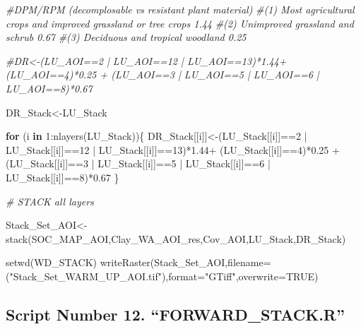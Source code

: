\documentclass[
  10pt,
  b5paper,
]{book}
\newenvironment{Shaded}{\begin{snugshade}}{\end{snugshade}}
\newcommand{\AttributeTok}[1]{\textcolor[rgb]{0.77,0.63,0.00}{#1}}
\newcommand{\CommentTok}[1]{\textcolor[rgb]{0.56,0.35,0.01}{\textit{#1}}}
\newcommand{\ConstantTok}[1]{\textcolor[rgb]{0.00,0.00,0.00}{#1}}
\newcommand{\ControlFlowTok}[1]{\textcolor[rgb]{0.13,0.29,0.53}{\textbf{#1}}}
\newcommand{\DecValTok}[1]{\textcolor[rgb]{0.00,0.00,0.81}{#1}}
\newcommand{\FloatTok}[1]{\textcolor[rgb]{0.00,0.00,0.81}{#1}}
\newcommand{\FunctionTok}[1]{\textcolor[rgb]{0.00,0.00,0.00}{#1}}
\newcommand{\NormalTok}[1]{#1}
\newcommand{\OtherTok}[1]{\textcolor[rgb]{0.56,0.35,0.01}{#1}}
\newcommand{\SpecialCharTok}[1]{\textcolor[rgb]{0.00,0.00,0.00}{#1}}
\newcommand{\StringTok}[1]{\textcolor[rgb]{0.31,0.60,0.02}{#1}}
\begin{document}
\begin{Shaded}
\begin{Highlighting}[]
\CommentTok{\#DPM/RPM (decomplosable vs resistant plant material)}
\CommentTok{\#(1) Most agricultural crops and improved grassland or tree crops 1.44 }
\CommentTok{\#(2) Unimproved grassland and schrub 0.67}
\CommentTok{\#(3) Deciduous and tropical woodland 0.25    }

\CommentTok{\#DR\textless{}{-}(LU\_AOI==2 | LU\_AOI==12 | LU\_AOI==13)*1.44+ (LU\_AOI==4)*0.25 + (LU\_AOI==3 | LU\_AOI==5 | LU\_AOI==6 | LU\_AOI==8)*0.67}

\NormalTok{DR\_Stack}\OtherTok{\textless{}{-}}\NormalTok{LU\_Stack}

\ControlFlowTok{for}\NormalTok{ (i }\ControlFlowTok{in} \DecValTok{1}\SpecialCharTok{:}\FunctionTok{nlayers}\NormalTok{(LU\_Stack))\{}
\NormalTok{DR\_Stack[[i]]}\OtherTok{\textless{}{-}}\NormalTok{(LU\_Stack[[i]]}\SpecialCharTok{==}\DecValTok{2} \SpecialCharTok{|}\NormalTok{ LU\_Stack[[i]]}\SpecialCharTok{==}\DecValTok{12} \SpecialCharTok{|}\NormalTok{ LU\_Stack[[i]]}\SpecialCharTok{==}\DecValTok{13}\NormalTok{)}\SpecialCharTok{*}\FloatTok{1.44}\SpecialCharTok{+}\NormalTok{ (LU\_Stack[[i]]}\SpecialCharTok{==}\DecValTok{4}\NormalTok{)}\SpecialCharTok{*}\FloatTok{0.25} \SpecialCharTok{+}\NormalTok{ (LU\_Stack[[i]]}\SpecialCharTok{==}\DecValTok{3} \SpecialCharTok{|}\NormalTok{ LU\_Stack[[i]]}\SpecialCharTok{==}\DecValTok{5} \SpecialCharTok{|}\NormalTok{ LU\_Stack[[i]]}\SpecialCharTok{==}\DecValTok{6} \SpecialCharTok{|}\NormalTok{ LU\_Stack[[i]]}\SpecialCharTok{==}\DecValTok{8}\NormalTok{)}\SpecialCharTok{*}\FloatTok{0.67}
\NormalTok{\}}

\CommentTok{\# STACK all layers}

\NormalTok{Stack\_Set\_AOI}\OtherTok{\textless{}{-}}\FunctionTok{stack}\NormalTok{(SOC\_MAP\_AOI,Clay\_WA\_AOI\_res,Cov\_AOI,LU\_Stack,DR\_Stack)}

\FunctionTok{setwd}\NormalTok{(WD\_STACK)}
\FunctionTok{writeRaster}\NormalTok{(Stack\_Set\_AOI,}\AttributeTok{filename=}\NormalTok{(}\StringTok{"Stack\_Set\_WARM\_UP\_AOI.tif"}\NormalTok{),}\AttributeTok{format=}\StringTok{"GTiff"}\NormalTok{,}\AttributeTok{overwrite=}\ConstantTok{TRUE}\NormalTok{)}
\end{Highlighting}
\end{Shaded}

\hypertarget{script-number-12.-forward_stack.r}{%
\subsection{Script Number 12. ``FORWARD\_STACK.R''}\label{script-number-12.-forward_stack.r}}
\end{document}
